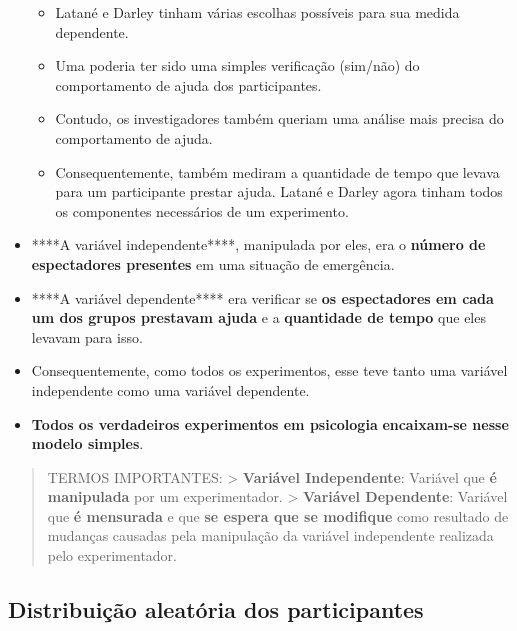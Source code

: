 \documentclass[
]{book}
\providecommand{\tightlist}{%
  \setlength{\itemsep}{0pt}\setlength{\parskip}{0pt}}
\begin{document}
\begin{itemize}
  \begin{itemize}
  \tightlist
  \item
    Latané e Darley tinham várias escolhas possíveis para sua medida dependente.
  \item
    Uma poderia ter sido uma simples verificação (sim/não) do comportamento de ajuda dos participantes.
  \item
    Contudo, os investigadores também queriam uma análise mais precisa do comportamento de ajuda.
  \item
    Consequentemente, também mediram a quantidade de tempo que levava para um participante prestar ajuda. Latané e Darley agora tinham todos os componentes necessários de um experimento.
  \end{itemize}
\item
  ****A variável independente****, manipulada por eles, era o \textbf{número de espectadores presentes} em uma situação de emergência.
\item
  ****A variável dependente**** era verificar se \textbf{os espectadores em cada um dos grupos prestavam ajuda} e a \textbf{quantidade de tempo} que eles levavam para isso.
\item
  Consequentemente, como todos os experimentos, esse teve tanto uma variável independente
  como uma variável dependente.
\item
  \textbf{Todos os verdadeiros experimentos em psicologia} \textbf{encaixam-se nesse modelo simples}.
\end{itemize}

\begin{quote}
TERMOS IMPORTANTES:
\textgreater{} \textbf{Variável Independente}: Variável que \textbf{é manipulada} por um experimentador.
\textgreater{} \textbf{Variável Dependente}: Variável que \textbf{é mensurada }e que \textbf{se espera que se modifique} como resultado de mudanças causadas pela manipulação da variável independente realizada pelo experimentador.
\end{quote}

\hypertarget{distribuiuxe7uxe3o-aleatuxf3ria-dos-participantes}{%
\subsection{Distribuição aleatória dos participantes}\label{distribuiuxe7uxe3o-aleatuxf3ria-dos-participantes}}
\end{document}
